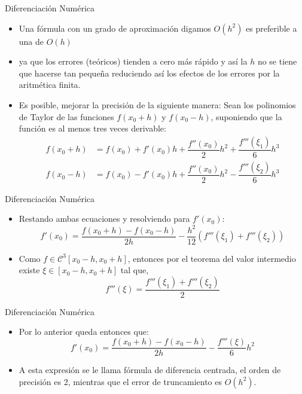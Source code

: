 \documentclass[12pt]{beamer}
\begin{document}
\begin{frame}{Diferenciaci\'on Num\'erica}
  \begin{itemize}
    \item Una f\'ormula con un grado de aproximaci\'on digamos $O(h^2)$ es preferible a una de $O(h)$
    \item<2-> ya que los errores (te\'oricos) tienden a cero m\'as r\'apido y as\'i la $h$ no se tiene que hacerse tan peque\~na reduciendo as\'i los efectos de los errores por la aritm\'etica finita.
    \item<3-> Es posible, mejorar la precisi\'on de la siguiente manera: Sean los polinomios de Taylor de las funciones $f(x_0 + h)$ y $f(x_0 - h)$, suponiendo que la funci\'on es al menos tres veces derivable:
    \begin{align*}
    f(x_0+h) &= f(x_0) + f'(x_0)h + \dfrac{f''(x_0)}{2}h^2 + \dfrac{f'''(\xi_1)}{6}h^3\\
    f(x_0-h) &= f(x_0) - f'(x_0)h + \dfrac{f''(x_0)}{2}h^2 - \dfrac{f'''(\xi_2)}{6}h^3
    \end{align*}
  \end{itemize}
\end{frame}
\begin{frame}{Diferenciaci\'on Num\'erica}
  \begin{itemize}
    \item Restando ambas ecuaciones y resolviendo para $f'(x_0)$:
    $$
    f'(x_0) = \dfrac{f(x_0+h)-f(x_0-h)}{2h} - \dfrac{h^2}{12}(f'''(\xi_1)+f'''(\xi_2))
    $$
    \item<2-> Como $f \in \mathcal{C}^3 [x_0-h, x_0+h]$, entonces por el teorema del valor intermedio existe $\xi \in [x_0-h, x_0+h]$ tal que,
    $$
    f'''(\xi) = \dfrac{f'''(\xi_1)+f'''(\xi_2)}{2}
    $$   
  \end{itemize}
\end{frame}
\begin{frame}{Diferenciaci\'on Num\'erica}
  \begin{itemize}
    \item Por lo anterior queda entonces que:
    $$
    f'(x_0) = \dfrac{f(x_0+h)-f(x_0-h)}{2h} - \dfrac{f'''(\xi)}{6}h^2
    $$
    \item<2-> A esta expresi\'on se le llama f\'ormula de diferencia centrada, el orden de precisi\'on es 2, mientras que el error de truncamiento es $O(h^2)$.
    \end{itemize}
\end{frame}
\end{document}
